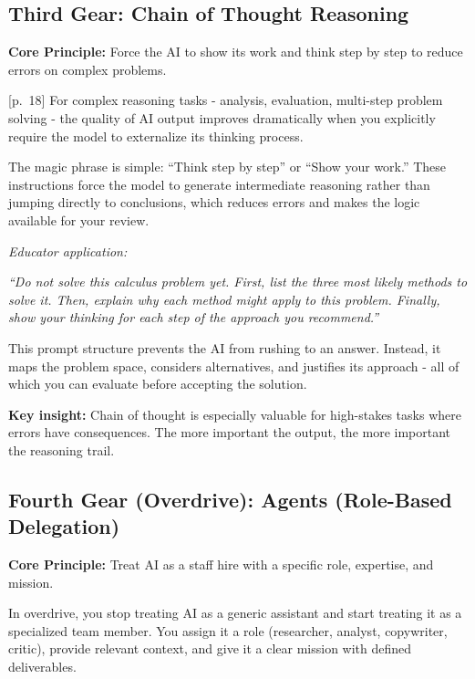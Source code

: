 \documentclass[
  letterpaper,
  DIV=11,
  numbers=noendperiod]{scrreprt}
\begin{document}
\subsection{Third Gear: Chain of Thought
Reasoning}\label{third-gear-chain-of-thought-reasoning}

\textbf{Core Principle:} Force the AI to show its work and think step by
step to reduce errors on complex problems.

{[}p.~18{]} For complex reasoning tasks - analysis, evaluation,
multi-step problem solving - the quality of AI output improves
dramatically when you explicitly require the model to externalize its
thinking process.

The magic phrase is simple: ``Think step by step'' or ``Show your
work.'' These instructions force the model to generate intermediate
reasoning rather than jumping directly to conclusions, which reduces
errors and makes the logic available for your review.

\emph{Educator application:}

\emph{``Do not solve this calculus problem yet. First, list the three
most likely methods to solve it. Then, explain why each method might
apply to this problem. Finally, show your thinking for each step of the
approach you recommend.''}

This prompt structure prevents the AI from rushing to an answer.
Instead, it maps the problem space, considers alternatives, and
justifies its approach - all of which you can evaluate before accepting
the solution.

\textbf{Key insight:} Chain of thought is especially valuable for
high-stakes tasks where errors have consequences. The more important the
output, the more important the reasoning trail.

\subsection{Fourth Gear (Overdrive): Agents (Role-Based
Delegation)}\label{fourth-gear-overdrive-agents-role-based-delegation}

\textbf{Core Principle:} Treat AI as a staff hire with a specific role,
expertise, and mission.

In overdrive, you stop treating AI as a generic assistant and start
treating it as a specialized team member. You assign it a role
(researcher, analyst, copywriter, critic), provide relevant context, and
give it a clear mission with defined deliverables.
\end{document}
